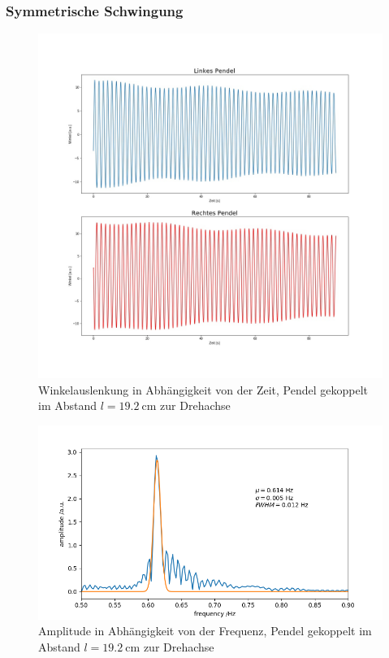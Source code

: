 \subsubsection{Symmetrische Schwingung}
\begin{figure}[H]
	\centering
	\includegraphics[height = 0.5 \textheight]{figures/211-5.jpeg}
	\caption{Winkelauslenkung in Abhängigkeit von der Zeit, Pendel gekoppelt im Abstand $l = \SI{19,2}{\cm}$ zur Drehachse}
\end{figure}
\begin{figure}[H]
	\centering
	\includegraphics[height = 0.25 \textheight]{figures/211-6.jpeg}
	\caption{Amplitude in Abhängigkeit von der Frequenz, Pendel gekoppelt im Abstand $l = \SI{19,2}{\cm}$ zur Drehachse}
\end{figure}

